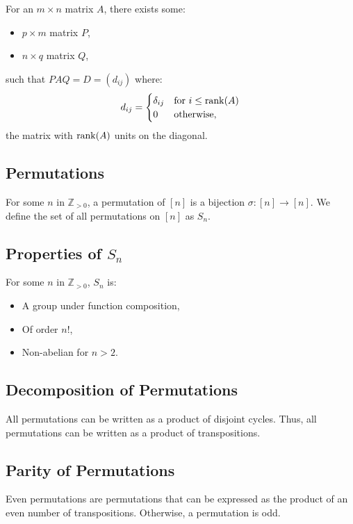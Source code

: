 For an $m \times n$ matrix $A$, there exists some: \begin{itemize}
    \item $p \times m$ matrix $P$,
    \item $n \times q$ matrix $Q$,
\end{itemize} such that $PAQ = D = (d_{ij})$ where: \begin{gather*}
    d_{ij} = \begin{cases}
        \delta_{ij} & \text{for } i \leq \operatorname{rank}(A) \\
        0           & \text{otherwise,}
    \end{cases}
\end{gather*} the matrix with $\operatorname{rank}(A)$ units on the diagonal.

\subsection{Permutations}

For some $n$ in $\mathbb{Z}_{> 0}$, a permutation of $[n]$ is a bijection
$\sigma : [n] \to [n]$. We define the set of all permutations on $[n]$ as
$S_n$.

\subsection{Properties of $S_n$}

For some $n$ in $\mathbb{Z}_{> 0}$, $S_n$ is: \begin{itemize}
    \item A group under function composition,
    \item Of order $n!$,
    \item Non-abelian for $n > 2$.
\end{itemize}

\subsection{Decomposition of Permutations}

All permutations can be written as a product of disjoint cycles. Thus,
all permutations can be written as a product of transpositions.

\subsection{Parity of Permutations}

Even permutations are permutations that can be expressed as the
product of an even number of transpositions. Otherwise, a
permutation is odd. 

